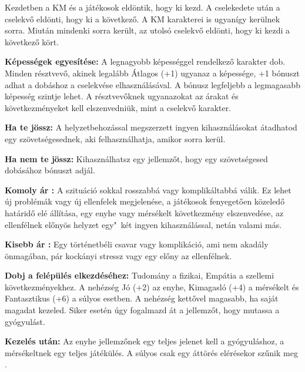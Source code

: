 \newpage

\begin{multicols*}{2}


Kezdetben a KM és a játékosok eldöntik, hogy ki kezd. A cselekedete után a cselekvő eldönti, hogy ki a következő. A KM karakterei is ugyanígy kerülnek sorra. Miután mindenki sorra került, az utolsó cselekvő eldönti, hogy ki kezdi a következő kört.


\textbf{Képességek egyesítése:} A legnagyobb képességgel rendelkező karakter dob. Minden résztvevő, akinek legalább Átlagos (+1) ugyanaz a képessége, +1 bónuszt adhat a dobáshoz a cselekvése elhasználásával. A bónusz legfeljebb a legmagasabb képesség szintje lehet. A résztvevőknek ugyanazokat az árakat és következményeket kell elszenvedniük, mint a cselekvő karakter.

\textbf{Ha te jössz:} A helyzetbehozással megszerzett ingyen kihasználásokat átadhatod egy szövetségesednek, aki felhasználhatja, amikor sorra kerül.

\textbf{Ha nem te jössz:} Kihasználhatsz egy jellemzőt, hogy egy szövetségesed dobásához bónuszt adjál.


\textbf{Komoly ár :} A szituáció sokkal rosszabbá vagy komplikáltabbá válik. Ez lehet új problémák vagy új ellenfelek megjelenése, a játékosok fenyegetően közeledő határidő elé állítása, egy enyhe vagy mérsékelt következmény elszenvedése, az ellenfélnek előnyös helyzet egy"~két ingyen kihasználással, netán valami más.

\textbf{Kisebb ár :} Egy történetbéli csavar vagy komplikáció, ami nem akadály önmagában, pár kockányi stressz vagy egy előny  az ellenfélnek.


\textbf{Dobj a felépülés elkezdéséhez:} Tudomány a fizikai, Empátia a szellemi következményekhez. A nehézség Jó (+2) az enyhe, Kimagasló (+4) a mérsékelt és Fantasztikus (+6) a súlyos esetben. A nehézség kettővel magasabb, ha saját magadat kezeled. Siker esetén úgy fogalmazd át a jellemzőt, hogy mutassa a gyógyulást.

\textbf{Kezelés után:} Az enyhe jellemzőnek egy teljes jelenet kell a gyógyuláshoz, a mérsékeltnek egy teljes játékülés. A súlyos csak egy áttörés elérésekor szűnik meg .


\end{multicols*}
